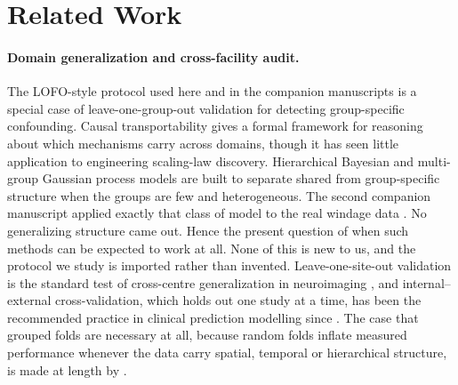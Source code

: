 \documentclass[journal=dce]{CUP-JNL-DTM}%
\begin{document}
\section{Related Work}

\paragraph{Domain generalization and cross-facility audit.}
The LOFO-style protocol used here and in the companion manuscripts \citep{gilruiz2026paper1,gilruiz2026paper2} is a special case of leave-one-group-out validation for detecting group-specific confounding. Causal transportability \citep{pearl2011transportability} gives a formal framework for reasoning about which mechanisms carry across domains, though it has seen little application to engineering scaling-law discovery. Hierarchical Bayesian and multi-group Gaussian process models \citep{li2025multigroup} are built to separate shared from group-specific structure when the groups are few and heterogeneous. The second companion manuscript applied exactly that class of model to the real windage data \citep{gilruiz2026paper2}. No generalizing structure came out. Hence the present question of when such methods can be expected to work at all. None of this is new to us, and the protocol we study is imported rather than invented. Leave-one-site-out validation is the standard test of cross-centre generalization in neuroimaging \citep{abraham2017deriving}, and internal--external cross-validation, which holds out one study at a time, has been the recommended practice in clinical prediction modelling since \citet{royston2004construction}. The case that grouped folds are necessary at all, because random folds inflate measured performance whenever the data carry spatial, temporal or hierarchical structure, is made at length by \citet{roberts2017cross}.
\end{document}
